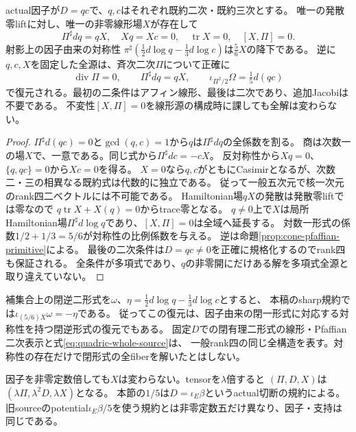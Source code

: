 \begin{theorem}\label{thm:quadric-cofactor-reconstruct}
actual因子が$D=qc$で、$q,c$はそれぞれ既約二次・既約三次とする。
唯一の発散零liftに対し、唯一の非零線形場$X$が存在して
\begin{equation}
 \Pi^\sharp dq=qX,\quad Xq=Xc=0,\quad
 \operatorname{tr}X=0,\quad [X,\Pi]=0.\label{eq:quadric-cofactor}
\end{equation}
射影上の因子由来の対称性
$\pi^\sharp(\frac12d\log q-\frac13d\log c)$は$\frac56X$の降下である。
逆に$q,c,X$を固定した全源は、斉次二次$\Pi$について正確に
\begin{equation}
 \operatorname{div}\Pi=0,\qquad \Pi^\sharp dq=qX,\qquad
 \iota_{\Pi^2/2}\Omega=\tfrac15d(qc)                 \label{eq:quadric-whole-source}
\end{equation}
で復元される。最初の二条件はアフィン線形、最後は二次であり、追加Jacobiは不要である。
不変性$[X,\Pi]=0$を線形源の構成時に課しても全解は変わらない。
\end{theorem}
\begin{proof}
$\Pi^\sharp d(qc)=0$と$\gcd(q,c)=1$から$q$は$\Pi^\sharp dq$の全係数を割る。
商は次数一の場$X$で、一意である。同じ式から$\Pi^\sharp dc=-cX$。
反対称性から$Xq=0$、$\{q,qc\}=0$から$Xc=0$を得る。
$X=0$なら$q,c$がともにCasimirとなるが、次数二・三の相異なる既約式は代数的に独立である。
従って一般五次元で核一次元のrank四二ベクトルには不可能である。
Hamiltonian場$qX$の発散は発散零liftでは零なので
$q\operatorname{tr}X+X(q)=0$からtrace零となる。
$q\ne0$上で$X$は局所Hamiltonian場$\Pi^\sharp d\log q$であり、$[X,\Pi]=0$は全域へ延長する。
対数一形式の係数$1/2+1/3=5/6$が対称性の比例係数を与える。
逆は命題\ref{prop:cone-pfaffian-primitive}による。
最後の二次条件は$D=qc\ne0$を正確に規格化するのでrank四も保証される。
全条件が多項式であり、$q$の非零開にだけある解を多項式全源と取り違えていない。
\end{proof}

補集合上の閉逆二形式を$\omega$、$\eta=\frac12d\log q-\frac13d\log c$とすると、
本稿のsharp規約では$\iota_{(5/6)\overline X}\omega=-\eta$である。
従ってこの復元は、因子由来の閉一形式に対応する対称性を持つ閉逆形式の復元でもある。
固定$D$での閉有理二形式の線形・Pfaffian二次表示と式\eqref{eq:quadric-whole-source}は、
一般rank四の同じ全構造を表す。対称性の存在だけで閉形式の全fiberを解いたとはしない。

因子を非零定数倍しても$X$は変わらない。tensorを$\lambda$倍すると
$(\Pi,D,X)$は$(\lambda\Pi,\lambda^2D,\lambda X)$となる。
本節の$1/5$は$D=\iota_E\beta$というactual切断の規約による。
旧sourceのpotential$\iota_E\beta/5$を使う規約とは非零定数五だけ異なり、因子・支持は同じである。

